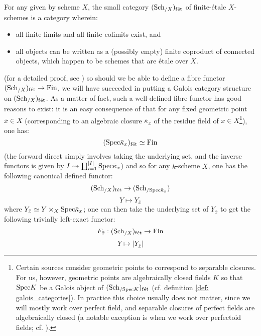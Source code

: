             \begin{remark} \label{remark: finite_etale_schemes}
                For any given by scheme $X$, the small category $(\mathrm{Sch}_{/X})_{\mathrm{f\acute{e}t}}$ of finite-\'etale $X$-schemes is a category wherein:
                    \begin{itemize}
                        \item all finite limits and all finite colimits exist, and
                        \item all objects can be written as a (possibly empty) finite coproduct of connected objects, which happen to be schemes that are \'etale over $X$.  
                    \end{itemize}
                (for a detailed proof, see \cite[\href{https://stacks.math.columbia.edu/tag/0BN9}{Tag 0BN9}]{stacks}) so should we be able to define a fibre functor $(\mathrm{Sch}_{/X})_{\mathrm{f\acute{e}t}} \to \mathrm{Fin}$, we will have succeeded in putting a Galois category structure on $(\mathrm{Sch}_{/X})_{\mathrm{f\acute{e}t}}$. As a matter of fact, such a well-defined fibre functor has good reasons to exist: it is an easy consequence of \cite[\href{https://stacks.math.columbia.edu/tag/00U3}{Tag 00U3}]{stacks} that for any fixed geometric point $\bar{x} \in X$ (corresponding to an algebraic closure $\bar{\kappa}_x$ of the residue field of $x \in X$\footnote{Certain sources consider geometric points to correspond to separable closures. For us, however, geometric points are algebraically closed fields $K$ so that $\mathrm{Spec} K$ be a Galois object of $(\mathrm{Sch}_{/\mathrm{Spec} K})_{\mathrm{f\acute{e}t}}$ (cf. definition \ref{def: galois_categories}). In practice this choice usually does not matter, since we will mostly work over perfect field, and separable closures of perfect fields are algebraically closed (a notable exception is when we work over perfectoid fields; cf. \cite{scholze2011perfectoid}).}), one has:
                    $$(\mathrm{Spec} \bar{\kappa}_x)_{\mathrm{f\acute{e}t}} \simeq \mathrm{Fin}$$
                (the forward direct simply involves taking the underlying set, and the inverse functors is given by $I \leadsto \coprod_{i = 1}^{|I|} \mathrm{Spec} \bar{\kappa}_x$) and so for any $k$-scheme $X$, one has the following canonical defined functor:
                    $$(\mathrm{Sch}_{/X})_{\mathrm{f\acute{e}t}} \to (\mathrm{Sch}_{/\mathrm{Spec} \bar{\kappa}_x})$$
                    $$Y \mapsto Y_{\bar{x}}$$
                where $Y_{\bar{x}} \cong Y \x_X \Spec \bar{\kappa}_x$; one can then take the underlying set of $Y_{\bar{x}}$ to get the following trivially left-exact functor:
                    $$F_{\bar{x}}: (\mathrm{Sch}_{/X})_{\mathrm{f\acute{e}t}} \to \mathrm{Fin}$$
                    $$Y \mapsto |Y_{\bar{x}}|$$

\end{remark}
